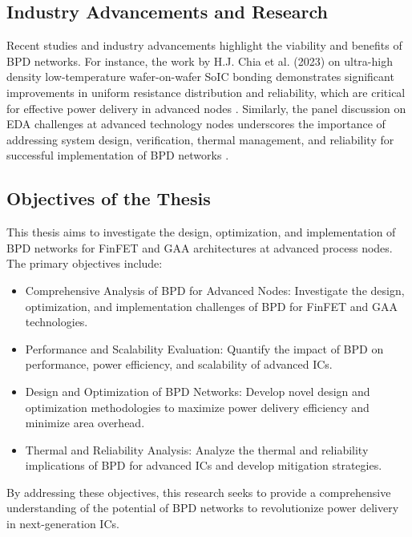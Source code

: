 \subsection{Industry Advancements and Research}

Recent studies and industry advancements highlight the viability and benefits of BPD networks. For instance, the work by H.J. Chia et al. (2023) on ultra-high density low-temperature wafer-on-wafer SoIC bonding demonstrates significant improvements in uniform resistance distribution and reliability, which are critical for effective power delivery in advanced nodes \cite{chia2023}. Similarly, the panel discussion on EDA challenges at advanced technology nodes underscores the importance of addressing system design, verification, thermal management, and reliability for successful implementation of BPD networks \cite{chang2024}.

\subsection{Objectives of the Thesis}

This thesis aims to investigate the design, optimization, and implementation of BPD networks for FinFET and GAA architectures at advanced process nodes. The primary objectives include:
\begin{itemize}
    \item Comprehensive Analysis of BPD for Advanced Nodes: Investigate the design, optimization, and implementation challenges of BPD for FinFET and GAA technologies.
    \item Performance and Scalability Evaluation: Quantify the impact of BPD on performance, power efficiency, and scalability of advanced ICs.
    \item Design and Optimization of BPD Networks: Develop novel design and optimization methodologies to maximize power delivery efficiency and minimize area overhead.
    \item Thermal and Reliability Analysis: Analyze the thermal and reliability implications of BPD for advanced ICs and develop mitigation strategies.
\end{itemize}

By addressing these objectives, this research seeks to provide a comprehensive understanding of the potential of BPD networks to revolutionize power delivery in next-generation ICs.
